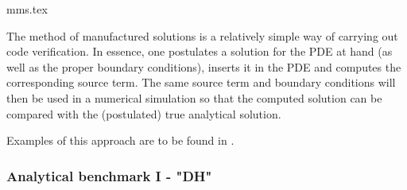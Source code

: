 \begin{flushright} {\tiny {\color{gray} mms.tex}} \end{flushright}

The method of manufactured solutions is a relatively simple way of carrying out
code verification. In essence, one postulates a solution for the PDE at hand (as
well as the proper boundary conditions), inserts it in the PDE and computes the 
corresponding source term. 
The same source term and boundary conditions will then be used in a numerical 
simulation so that the computed solution can be compared with the (postulated)
true analytical solution. 

Examples of this approach are to be found in \cite{dohu03,busa13,bodg06,polp14,polp14b,lopp14,blmp16}.

\subsubsection{Analytical benchmark I \label{mms1} - "DH"}


